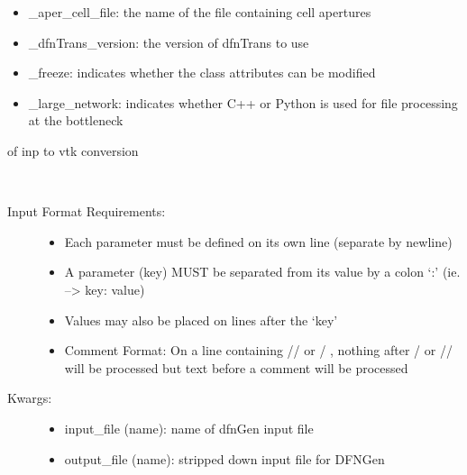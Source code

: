 \documentclass[letterpaper,10pt,english]{sphinxmanual}
\begin{document}
\begin{fulllineitems}
\begin{description}
\begin{itemize}
\item {} 
\_aper\_cell\_file: the name of the file containing cell apertures

\item {} 
\_dfnTrans\_version: the version of dfnTrans to use

\item {} 
\_freeze: indicates whether the class attributes can be modified

\item {} 
\_large\_network: indicates whether C++ or Python is used for file processing at the bottleneck

\end{itemize}

of inp to vtk conversion

\end{description}

\begin{fulllineitems}
\label{pydfnworks:pydfnworks.DFNWORKS.check_input}~\begin{description}
\item[{Input Format Requirements:  }] \leavevmode\begin{itemize}
\item {} 
Each parameter must be defined on its own line (separate by newline)

\item {} 
A parameter (key) MUST be separated from its value by a colon `:' (ie. --\textgreater{} key: value)

\item {} 
Values may also be placed on lines after the `key'

\item {} 
Comment Format:  On a line containing  // or / \code{*}, nothing after \code{*} / or // will be processed  but text before a comment will be processed

\end{itemize}

\item[{Kwargs:}] \leavevmode\begin{itemize}
\item {} 
input\_file (name): name of dfnGen input file

\item {} 
output\_file (name): stripped down input file for DFNGen


\end{itemize}
\end{description}
\end{fulllineitems}
\end{fulllineitems}
\end{document}
